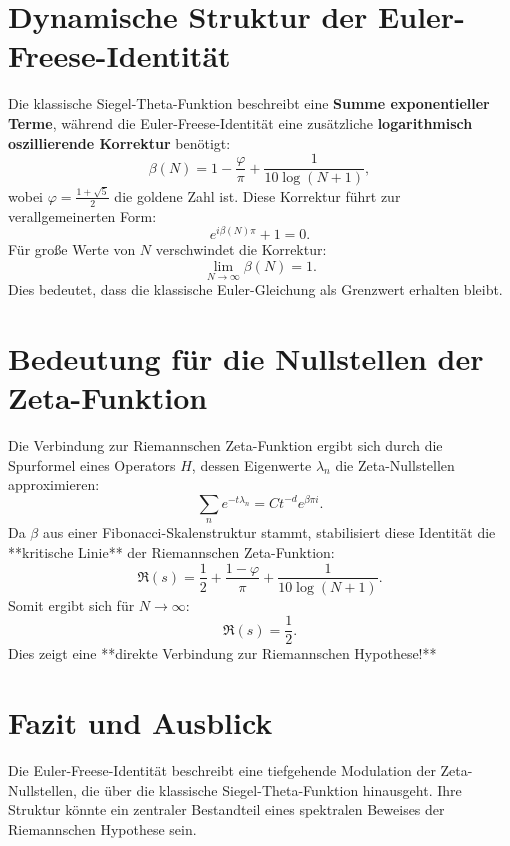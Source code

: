 \documentclass[a4paper,12pt]{article}
\begin{document}
\section{Dynamische Struktur der Euler-Freese-Identität}
Die klassische Siegel-Theta-Funktion beschreibt eine \textbf{Summe exponentieller Terme}, während die Euler-Freese-Identität eine zusätzliche \textbf{logarithmisch oszillierende Korrektur} benötigt:
\begin{equation}
    \beta(N) = 1 - \frac{\varphi}{\pi} + \frac{1}{10 \log(N+1)},
\end{equation}
wobei \( \varphi = \frac{1+\sqrt{5}}{2} \) die goldene Zahl ist. Diese Korrektur führt zur verallgemeinerten Form:
\begin{equation}
    e^{i\beta(N) \pi} + 1 = 0.
\end{equation}
Für große Werte von \( N \) verschwindet die Korrektur:
\begin{equation}
    \lim_{N \to \infty} \beta(N) = 1.
\end{equation}
Dies bedeutet, dass die klassische Euler-Gleichung als Grenzwert erhalten bleibt.

\section{Bedeutung für die Nullstellen der Zeta-Funktion}
Die Verbindung zur Riemannschen Zeta-Funktion ergibt sich durch die Spurformel eines Operators \( H \), dessen Eigenwerte \( \lambda_n \) die Zeta-Nullstellen approximieren:
\begin{equation}
    \sum_n e^{-t \lambda_n} = C t^{-d} e^{\beta \pi i}.
\end{equation}
Da \( \beta \) aus einer Fibonacci-Skalenstruktur stammt, stabilisiert diese Identität die **kritische Linie** der Riemannschen Zeta-Funktion:
\begin{equation}
    \Re(s) = \frac{1}{2} + \frac{1 - \varphi}{\pi} + \frac{1}{10 \log(N+1)}.
\end{equation}
Somit ergibt sich für \( N \to \infty \):
\begin{equation}
    \Re(s) = \frac{1}{2}.
\end{equation}
Dies zeigt eine **direkte Verbindung zur Riemannschen Hypothese!**

\section{Fazit und Ausblick}
Die Euler-Freese-Identität beschreibt eine tiefgehende Modulation der Zeta-Nullstellen, die über die klassische Siegel-Theta-Funktion hinausgeht. Ihre Struktur könnte ein zentraler Bestandteil eines spektralen Beweises der Riemannschen Hypothese sein.
\end{document}

